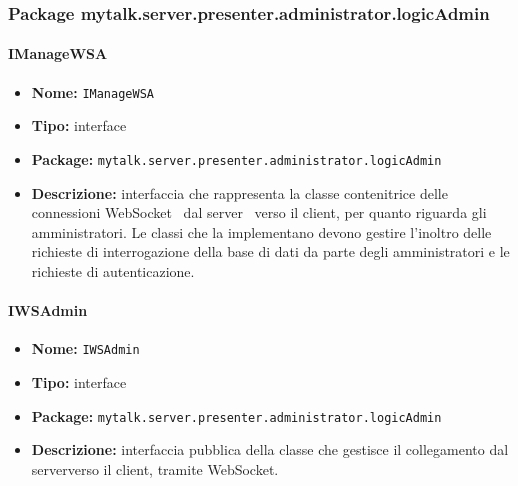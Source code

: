 \subsubsection{Package mytalk.server.presenter.administrator.logicAdmin}
\paragraph{IManageWSA}{
	\begin{itemize}
		\item [] \textbf{Nome:} \texttt{IManageWSA}
		\item [] \textbf{Tipo:} interface
		\item [] \textbf{Package:} \texttt{mytalk.server.presenter.administrator.logicAdmin}
		\item [] \textbf{Descrizione:}{ interfaccia che rappresenta la classe contenitrice delle connessioni WebSocket\g~ dal server\g~ verso il client\g, per quanto riguarda gli amministratori. Le classi che la implementano devono gestire l'inoltro delle richieste di interrogazione della base di dati da parte degli amministratori e le richieste di autenticazione.}
	\end{itemize}
}

\paragraph{IWSAdmin}{
	\begin{itemize}
		\item [] \textbf{Nome:} \texttt{IWSAdmin}
		\item [] \textbf{Tipo:} interface
		\item [] \textbf{Package:} \texttt{mytalk.server.presenter.administrator.logicAdmin}
		\item [] \textbf{Descrizione:}{ interfaccia pubblica della classe che gestisce il collegamento dal server\g verso il client\g, tramite WebSocket\g.}
	\end{itemize}
}


